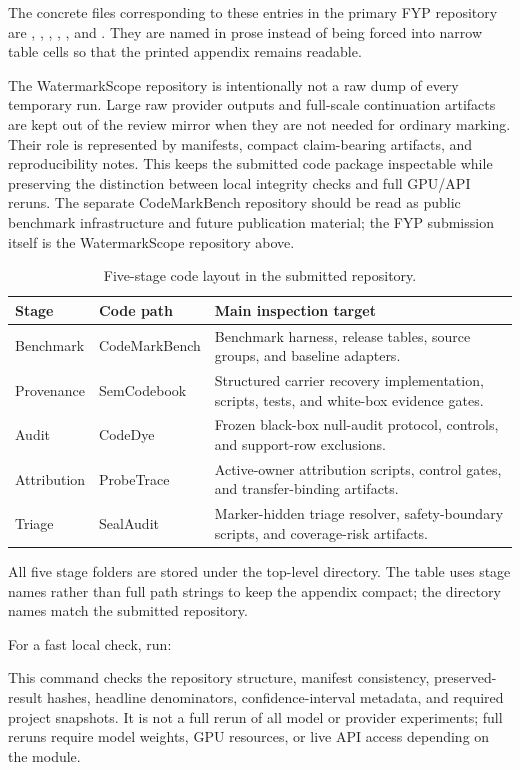 The concrete files corresponding to these entries in the primary FYP repository are ,
, , ,
, and
. They are named in prose instead of
being forced into narrow table cells so that the printed appendix remains
readable.

The WatermarkScope repository is intentionally not a raw dump of every temporary run. Large raw provider outputs and full-scale continuation artifacts are kept out of the review mirror when they are not needed for ordinary marking. Their role is represented by manifests, compact claim-bearing artifacts, and reproducibility notes. This keeps the submitted code package inspectable while preserving the distinction between local integrity checks and full GPU/API reruns. The separate CodeMarkBench repository should be read as public benchmark infrastructure and future publication material; the FYP submission itself is the WatermarkScope repository above.

\begin{table}[htbp]
\centering
\caption{Five-stage code layout in the submitted repository.}
\label{tab:repository-stage-layout}
\lookuptable
\begin{tabularx}{\textwidth}{@{}L{2.05cm}L{2.65cm}Y@{}}
\toprule
Stage & Code path & Main inspection target \\
\midrule
Benchmark & CodeMarkBench & Benchmark harness, release tables, source groups, and baseline adapters. \\
Provenance & SemCodebook & Structured carrier recovery implementation, scripts, tests, and white-box evidence gates. \\
Audit & CodeDye & Frozen black-box null-audit protocol, controls, and support-row exclusions. \\
Attribution & ProbeTrace & Active-owner attribution scripts, control gates, and transfer-binding artifacts. \\
Triage & SealAudit & Marker-hidden triage resolver, safety-boundary scripts, and coverage-risk artifacts. \\
\bottomrule
\end{tabularx}
\end{table}

All five stage folders are stored under the top-level 
directory. The table uses stage names rather than full path strings to keep
the appendix compact; the directory names match the submitted repository.

For a fast local check, run:
\begin{center}
\end{center}
This command checks the repository structure, manifest consistency, preserved-result hashes, headline denominators, confidence-interval metadata, and required project snapshots. It is not a full rerun of all model or provider experiments; full reruns require model weights, GPU resources, or live API access depending on the module.
